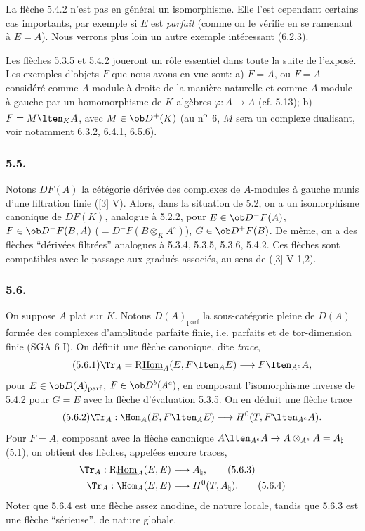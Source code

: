 La flèche 5.4.2 n'est pas en général un isomorphisme. Elle l'est cependant certains cas importants, par exemple si $E$ est \emph{parfait} (comme on le vérifie en se ramenant à $E=A$). Nous verrons plus loin un autre exemple intéressant (6.2.3).

Les flèches 5.3.5 et 5.4.2 joueront un rôle essentiel dans toute la suite de l'exposé. Les exemples d'objets $F$ que nous avons en vue sont: a) $F=A$, ou $F=A$ considéré comme $A$-module à droite de la manière naturelle et comme $A$-module à gauche par un homomorphisme de $K$-algèbres $\varphi:A\to A$ (cf. 5.13); b) $F=M\lten_KA$, avec $M\in\ob D^+(K)$ (au n\textsuperscript{o}~6, $M$ sera un complexe dualisant, voir notamment 6.3.2, 6.4.1, 6.5.6).

\subsubsection*{5.5.}

Notons $DF(A)$ la cétégorie dérivée des complexes de $A$-modules à gauche munis d'une filtration finie ([3] V). Alors, dans la situation de 5.2, on a un isomorphisme canonique de $DF(K)$, analogue à 5.2.2, pour $E\in\ob D^-F(A)$, $F\in\ob D^-F(B,A)$ ($=D^-F(B\otimes_KA^\circ)$), $G\in\ob D^+F(B)$. De même, on a des flèches ``dérivées filtrées'' analogues à 5.3.4, 5.3.5, 5.3.6, 5.4.2. Ces flèches sont compatibles avec le passage aux gradués associés, au sens de ([3] V 1,2).

\subsubsection*{5.6.}

On suppose $A$ plat sur $K$. Notons $D(A)_{\mathrm{parf}}$ la sous-catégorie pleine de $D(A)$ formée des complexes d'amplitude parfaite finie, i.e. parfaits et de tor-dimension finie (SGA 6 I). On définit une flèche canonique, dite \emph{trace},
\begin{equation}\tag{5.6.1}
\Tr_A=\mathrm{R}\underline{\mathrm{Hom}}_A(E,F\lten_AE)\longrightarrow F\lten_{A^e}A,
\end{equation}
pour $E\in\ob D(A)_{\mathrm{parf}}$, $F\in\ob D^b(A^e)$, en composant l'isomorphisme inverse de 5.4.2 pour $G=E$ avec la flèche d'évaluation 5.3.5. On en déduit une flèche trace
\begin{equation}\tag{5.6.2}
\Tr_A:\Hom_A(E,F\lten_AE)\longrightarrow H^0(T,F\lten_{A^e}A).
\end{equation}
Pour $F=A$, composant avec la flèche canonique $A\lten_{A^e}A\to A\otimes_{A^e}A=A_\natural$ (5.1), on obtient des flèches, appelées encore traces,
\begin{align}
\Tr_A:\mathrm{R}\underline{\mathrm{Hom}}_A(E,E)&\longrightarrow A_\natural,\tag{5.6.3}\\
\Tr_A:\Hom_A(E,E)&\longrightarrow H^0(T,A_\natural).\tag{5.6.4}
\end{align}
Noter que 5.6.4 est une flèche assez anodine, de nature locale, tandis que 5.6.3 est une flèche ``sérieuse'', de nature globale.

